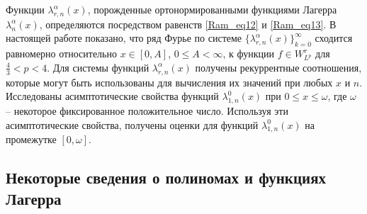 \documentclass[a4paper,12pt]{article}
\begin{document}
Функции $\lambda_{r,n}^{\alpha}(x)$, порожденные ортонормированными функциями Лагерра $\lambda_{n}^{\alpha}(x)$, определяются посредством равенств \eqref{Ram_eq12} и \eqref{Ram_eq13}.
В настоящей работе показано, что ряд Фурье по системе $\{\lambda_{r,n}^{\alpha}(x)\}_{k=0}^\infty$ сходится равномерно относительно $x\in[0, A]$, $0\leq A<\infty$, к функции $f\in W^r_{L^p}$ для $\frac{4}{3}<p<4$.
Для системы функций $\lambda_{r,n}^{\alpha}(x)$ получены рекуррентные соотношения, которые могут быть использованы для вычисления их значений при любых $x$ и $n$.
Исследованы асимптотические свойства функций $\lambda_{1,n}^0(x)$ при $0\leq x\leq\omega$, где $\omega$ -- некоторое фиксированное положительное число. Используя эти асимптотические свойства, получены оценки для функций $\lambda_{1,n}^0(x)$ на промежутке $[0,\omega]$.

\subsection{Некоторые сведения о полиномах и функциях Лагерра}
\end{document}
